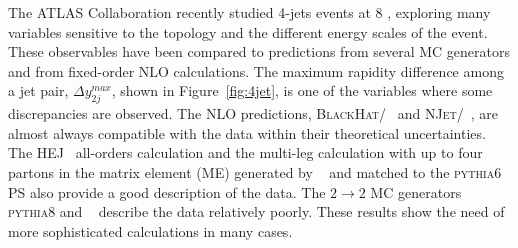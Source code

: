 \documentclass{PoS}
\providecommand{\NJET} {{\textsc{NJet}}\xspace}
\providecommand{\BLACKHAT} {{\textsc{BlackHat}}\xspace}
\providecommand{\HEJ} {{\textsc{HEJ}}\xspace}
\providecommand{\PYTHIAS} {{\textsc{pythia6}}\xspace}
\providecommand{\PYTHIAE} {{\textsc{pythia8}}\xspace}
\begin{document}
The ATLAS Collaboration recently studied 4-jets events at 8 \TeV\cite{Aad:2015nda}, exploring many variables sensitive to the topology and the
different energy scales of the event. These observables have been compared to predictions from several MC
generators and from fixed-order NLO calculations. The maximum rapidity difference among a jet pair, $\Delta
y_{2j}^{max}$, shown in Figure~\ref{fig:4jet}, is one of the variables where some discrepancies are observed. 
The NLO predictions, \BLACKHAT/\SHERPA~\cite{Berger:2008sj,Bern:2011ep} and
\NJET/\SHERPA~\cite{Badger:2012pg,Badger:2012pf}, are almost always compatible with the data within their 
theoretical uncertainties. The \HEJ~\cite{Andersen:2009nu,Andersen:2011hs} all-orders calculation and the multi-leg calculation with up to four partons in the
matrix element (ME) generated by \MADGRAPH~\cite{Alwall:2014hca} and matched to the \PYTHIAS~\cite{Sjostrand:2006za} PS also provide a good description of
the data. The $2\to 2$ MC generators \PYTHIAE and \HERWIGpp~\cite{Bahr:2008pv}
 describe the data relatively poorly. These results show the need of more sophisticated calculations in many cases. 
\end{document}

